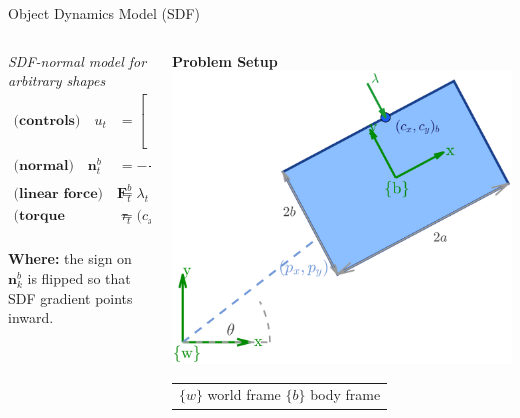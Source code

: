 \documentclass[10pt, aspectratio=169]{beamer}
\begin{document}
\begin{frame}{Object Dynamics Model (SDF)}
  \begin{columns}[T,onlytextwidth]
    \begin{column}{0.65\textwidth}
      \small
      \emph{SDF-normal model for arbitrary shapes}
      \begin{align*}
        \textbf{(controls)}\quad
        u_t &= \begin{bmatrix} c_{x,t} \\ c_{y,t} \\ \lambda_t \end{bmatrix} \\ 
        \textbf{(normal)}\quad
        \mathbf{n}^b_t &= -\frac{\nabla\phi(\mathbf{c}_t)}{\|\nabla\phi(\mathbf{c}_t)\|} \\[0.15em]
        \textbf{(linear force)}\quad
        \mathbf{F}^b_t &= \lambda_t\,\mathbf{n}^b_t, \quad \mathbf{F}^w_t = R(\theta_t)\,\mathbf{F}^b_t \\[0.15em]
        \textbf{(torque about COM)}\quad
        \tau_t &= \big(c_{x,t} n^b_{y,t} - c_{y,t} n^b_{x,t}\big)\,\lambda_t \\[0.15em]
      \end{align*}

      \textbf{Where:} the sign on $\mathbf{n}^b_k$ is flipped so that SDF gradient points inward.
    \end{column}

    \begin{column}{0.35\textwidth}
      \centering
      {\bfseries Problem Setup}\\[0.4em]
      \includegraphics[width=\linewidth]{Figures/pushbox_crisp_example_sdf.png}

      \vspace{0.4em}
      \footnotesize
      \begin{tabular}{@{}l@{}}
        $\{w\}$ world frame \quad $\{b\}$ body frame
      \end{tabular}
    \end{column}
  \end{columns}
\end{frame}
\end{document}
